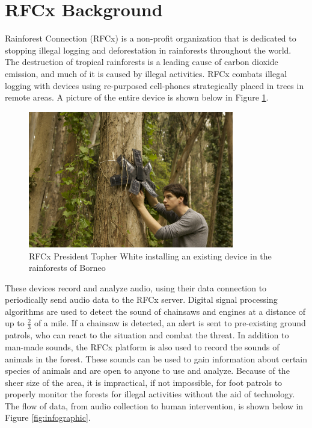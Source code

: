 \documentclass{article}
\newcommand{\ASSNMT}{Project Necromancer}
\numberwithin{figure}{section}
\numberwithin{equation}{section}
\begin{document}
{
\pagestyle{fancy}
\fancyhf{}
\lhead{\ASSNMT}
\rhead{\leftmark}
\setlength{\parindent}{0cm}
\newpage
\tableofcontents
\newpage
\section{RFCx Background} \label{sect:background}
Rainforest Connection (RFCx) is a non-profit organization that is dedicated to stopping illegal logging and deforestation in rainforests throughout the world. The destruction of tropical rainforests is a leading cause of carbon dioxide emission, and much of it is caused by illegal activities. RFCx combats illegal logging with devices using re-purposed cell-phones strategically placed in trees in remote areas. A picture of the entire device is shown below in Figure \ref{fig:device}.

\begin{figure}[H]
  \centering
  \includegraphics[width=0.8\textwidth]{device}
  \caption{RFCx President Topher White installing an existing device in the rainforests of Borneo}
  \label{fig:device}
\end{figure}
\newpage

These devices record and analyze audio, using their data connection to periodically send audio data to the RFCx server. Digital signal processing algorithms are used to detect the sound of chainsaws and engines at a distance of up to $\frac{2}{3}$ of a mile. If a chainsaw is detected, an alert is sent to pre-existing ground patrols, who can react to the situation and combat the threat. In addition to man-made sounds, the RFCx platform is also used to record the sounds of animals in the forest. These sounds can be used to gain information about certain species of animals and are open to anyone to use and analyze. Because of the sheer size of the area, it is impractical, if not impossible, for foot patrols to properly monitor the forests for illegal activities without the aid of technology. The flow of data, from audio collection to human intervention, is shown below in Figure \ref{fig:infographic}.

}
\end{document}
